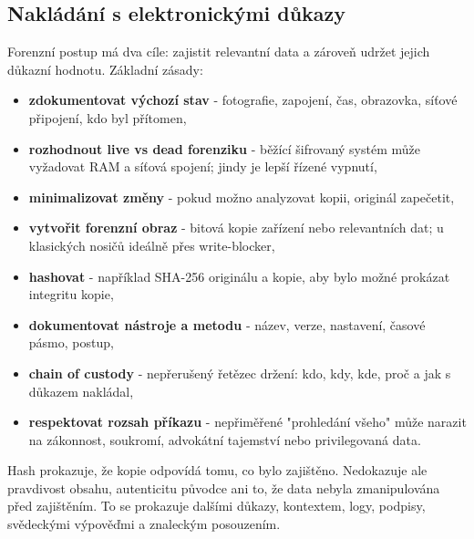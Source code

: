 \subsection*{Nakládání s elektronickými důkazy}
Forenzní postup má dva cíle: zajistit relevantní data a zároveň udržet jejich důkazní hodnotu. Základní zásady:
\begin{itemize}
  \item \textbf{zdokumentovat výchozí stav} - fotografie, zapojení, čas, obrazovka, síťové připojení, kdo byl přítomen,
  \item \textbf{rozhodnout live vs dead forenziku} - běžící šifrovaný systém může vyžadovat RAM a síťová spojení; jindy je lepší řízené vypnutí,
  \item \textbf{minimalizovat změny} - pokud možno analyzovat kopii, originál zapečetit,
  \item \textbf{vytvořit forenzní obraz} - bitová kopie zařízení nebo relevantních dat; u klasických nosičů ideálně přes write-blocker,
  \item \textbf{hashovat} - například SHA-256 originálu a kopie, aby bylo možné prokázat integritu kopie,
  \item \textbf{dokumentovat nástroje a metodu} - název, verze, nastavení, časové pásmo, postup,
  \item \textbf{chain of custody} - nepřerušený řetězec držení: kdo, kdy, kde, proč a jak s důkazem nakládal,
  \item \textbf{respektovat rozsah příkazu} - nepřiměřené "prohledání všeho" může narazit na zákonnost, soukromí, advokátní tajemství nebo privilegovaná data.
\end{itemize}

Hash prokazuje, že kopie odpovídá tomu, co bylo zajištěno. Nedokazuje ale pravdivost obsahu, autenticitu původce ani to, že data nebyla zmanipulována před zajištěním. To se prokazuje dalšími důkazy, kontextem, logy, podpisy, svědeckými výpověďmi a znaleckým posouzením.


